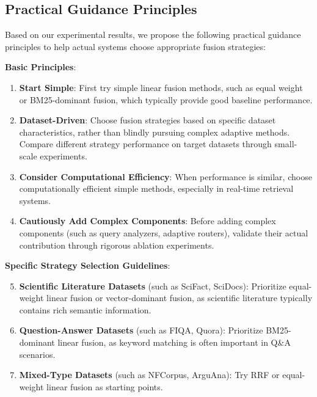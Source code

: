 \documentclass[letterpaper]{article} %
\begin{document}
\subsection{Practical Guidance Principles}

Based on our experimental results, we propose the following practical guidance principles to help actual systems choose appropriate fusion strategies:

\textbf{Basic Principles}:
\begin{enumerate}
\item \textbf{Start Simple}: First try simple linear fusion methods, such as equal weight or BM25-dominant fusion, which typically provide good baseline performance.

\item \textbf{Dataset-Driven}: Choose fusion strategies based on specific dataset characteristics, rather than blindly pursuing complex adaptive methods. Compare different strategy performance on target datasets through small-scale experiments.

\item \textbf{Consider Computational Efficiency}: When performance is similar, choose computationally efficient simple methods, especially in real-time retrieval systems.

\item \textbf{Cautiously Add Complex Components}: Before adding complex components (such as query analyzers, adaptive routers), validate their actual contribution through rigorous ablation experiments.
\end{enumerate}

\textbf{Specific Strategy Selection Guidelines}:
\begin{enumerate}
\setcounter{enumi}{4}
\item \textbf{Scientific Literature Datasets} (such as SciFact, SciDocs): Prioritize equal-weight linear fusion or vector-dominant fusion, as scientific literature typically contains rich semantic information.

\item \textbf{Question-Answer Datasets} (such as FIQA, Quora): Prioritize BM25-dominant linear fusion, as keyword matching is often important in Q\&A scenarios.

\item \textbf{Mixed-Type Datasets} (such as NFCorpus, ArguAna): Try RRF or equal-weight linear fusion as starting points.
\end{enumerate}
\end{document}
